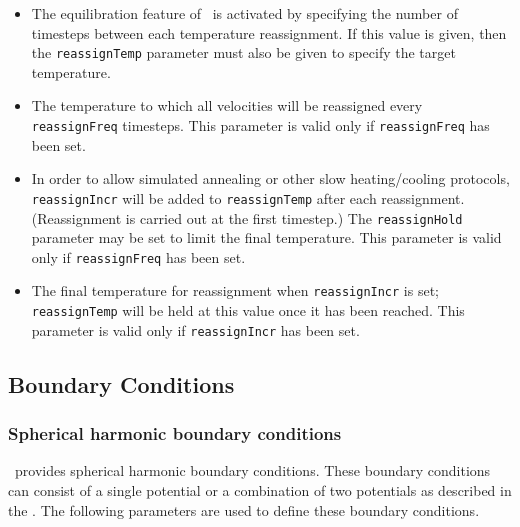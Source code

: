 \begin{itemize}

\item
{}
{The equilibration feature of \NAMD\ is activated by 
specifying the number of timesteps between each temperature reassignment.
If this value is given, then the {\tt reassignTemp} parameter must also 
be given to specify the target temperature. }

\item
{}
{The temperature to which all velocities will be reassigned
every {\tt reassignFreq} timesteps.  
This parameter is valid only if {\tt reassignFreq} has been set.}

\item
{}
{In order to allow simulated annealing or other slow heating/cooling protocols, {\tt reassignIncr} will be added to {\tt reassignTemp} after each reassignment.
(Reassignment is carried out at the first timestep.)  The {\tt reassignHold} parameter may be set to limit the final temperature.
This parameter is valid only if {\tt reassignFreq} has been set.}

\item
{}
{The final temperature for reassignment when {\tt reassignIncr} is set; {\tt reassignTemp} will be held at this value once it has been reached.
This parameter is valid only if {\tt reassignIncr} has been set.}

\end{itemize}

\subsection{Boundary Conditions}

\subsubsection{Spherical harmonic boundary conditions}

\NAMD\ provides spherical harmonic boundary conditions.  These 
boundary conditions can consist of a single potential or a 
combination of two potentials as described in the \PG.  
The following parameters are used to define these boundary conditions.  

